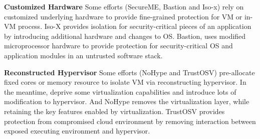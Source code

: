 \documentclass[conference]{IEEEtran}
\begin{document}
\textbf{Customized Hardware }
Some efforts (SecureME\cite{Chhabra2011SecureME}, Bastion\cite{Champagne2010Scalable} and Iso-x\cite{Evtyushkin2015Iso}) rely on 
customized underlying hardware to provide fine-grained protection for VM or in-VM process. 
Iso-X provides isolation for security-critical pieces of an application by introducing additional hardware and changes to OS. Bastion, uses modified microprocessor hardware to provide protection for security-critical OS and application modules in an untrusted software stack. 



\textbf{Reconstructed Hypervisor }
Some efforts (NoHype\cite{NoHype} and TrustOSV\cite{TrustOSV}) pre-allocate fixed cores or memory resource to isolate VM via reconstructing hypervisor. In the meantime, deprive some virtualization capabilities and introduce lots of modification to hypervisor. And NoHype removes the virtualization layer, while retaining the key features enabled by virtualization. TrustOSV provides protection from compromised cloud environment by removing interaction between exposed executing environment and hypervisor.
\end{document}
